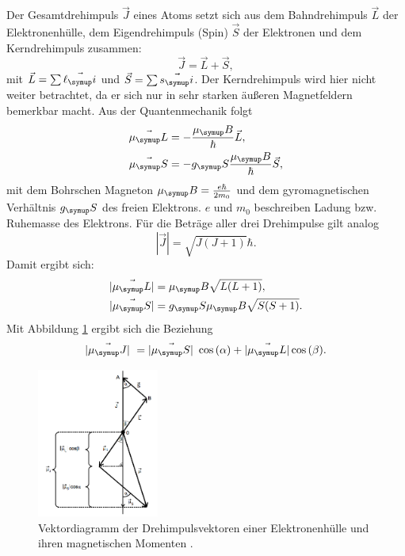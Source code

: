 \noindent Der Gesamtdrehimpuls $\vec{J}$ eines Atoms setzt sich aus dem Bahndrehimpuls $\vec{L}$
der Elektronenhülle, dem Eigendrehimpuls (Spin) $\vec{S}$ der Elektronen und dem
Kerndrehimpuls zusammen:
\begin{equation}
  \vec{J} = \vec{L} + \vec{S},
\end{equation}
mit $\vec{L} = \sum \vec{\ell_\su{i}}$ und $\vec{S} = \sum \vec{s_\su{i}}$.
Der Kerndrehimpuls wird hier nicht weiter betrachtet,
da er sich nur in sehr starken äußeren Magnetfeldern bemerkbar macht.
Aus der Quantenmechanik folgt
\begin{align}
  \vec{\mu_\su{L}} &= -\frac{\mu_\su{B}}{\hbar} \vec{L}, \\
  \vec{\mu_\su{S}} &= -g_\su{S}\frac{\mu_\su{B}}{\hbar} \vec{S},
\end{align}
mit dem Bohrschen Magneton $\mu_\su{B} = \frac{e \hbar}{2m_0}$ und dem
gyromagnetischen Verhältnis $g_\su{S}$ des freien Elektrons. $e$ und $m_0$
beschreiben Ladung bzw. Ruhemasse des Elektrons.
Für die Beträge aller drei Drehimpulse gilt analog
\begin{equation}
  |\vec{J}| = \sqrt{J(J+1)} \hbar.
\end{equation}
Damit ergibt sich:
\begin{align}
  |\vec{\mu_\su{L}}| &= \mu_\su{B}\sqrt{L(L+1)}, \\
  |\vec{\mu_\su{S}}| &= g_\su{S}\mu_\su{B}\sqrt{S(S+1)}.
\end{align}
Mit Abbildung \ref{fig:drehimpuls} ergibt sich die Beziehung
\begin{equation}
  |\vec{\mu_\su{J}}| = |\vec{\mu_\su{S}}| \cos{(\alpha)} + |\vec{\mu_\su{L}}|
  \cos{(\beta)}.
\end{equation}
  \begin{figure}
  \centering
  \includegraphics[width=4cm]{bilder/drehimpuls.png}
  \caption{Vektordiagramm der Drehimpulsvektoren einer Elektronenhülle und ihren
  magnetischen Momenten \cite{606}.}
  \label{fig:drehimpuls}
\end{figure}
